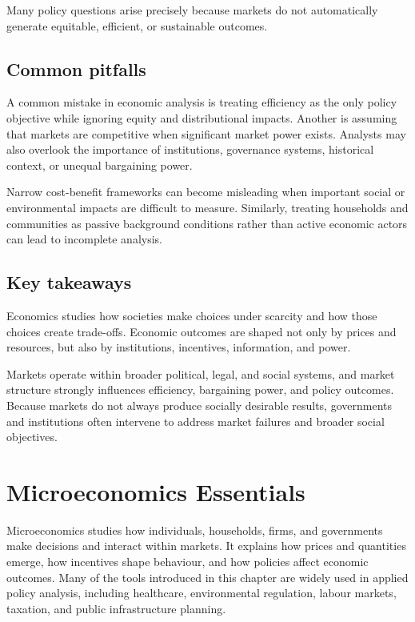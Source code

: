 \documentclass[
  11pt,
  oneside]{book}
\begin{document}
Many policy questions arise precisely because markets do not automatically generate equitable, efficient, or sustainable outcomes.

\section{Common pitfalls}\label{common-pitfalls}

A common mistake in economic analysis is treating efficiency as the only policy objective while ignoring equity and distributional impacts. Another is assuming that markets are competitive when significant market power exists. Analysts may also overlook the importance of institutions, governance systems, historical context, or unequal bargaining power.

Narrow cost-benefit frameworks can become misleading when important social or environmental impacts are difficult to measure. Similarly, treating households and communities as passive background conditions rather than active economic actors can lead to incomplete analysis.

\section{Key takeaways}\label{key-takeaways}

Economics studies how societies make choices under scarcity and how those choices create trade-offs. Economic outcomes are shaped not only by prices and resources, but also by institutions, incentives, information, and power.

Markets operate within broader political, legal, and social systems, and market structure strongly influences efficiency, bargaining power, and policy outcomes. Because markets do not always produce socially desirable results, governments and institutions often intervene to address market failures and broader social objectives.

\chapter{Microeconomics Essentials}\label{micro}

Microeconomics studies how individuals, households, firms, and governments make decisions and interact within markets. It explains how prices and quantities emerge, how incentives shape behaviour, and how policies affect economic outcomes. Many of the tools introduced in this chapter are widely used in applied policy analysis, including healthcare, environmental regulation, labour markets, taxation, and public infrastructure planning.
\end{document}
